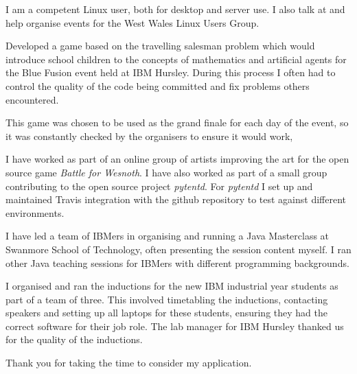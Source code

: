 \documentclass[10pt,stdletter,dateno,sigleft]{newlfm} %
\begin{document}
\begin{newlfm}
I am a competent Linux user, both for desktop and server use. I also talk at 
and help organise events for the West Wales Linux Users Group.

Developed a game based on the travelling salesman problem which would introduce
school children to the concepts of mathematics and artificial agents for the
Blue Fusion event held at IBM Hursley. During this process I often had to 
control the quality of the code being committed and fix problems others 
encountered.

This game was chosen to be used as the grand finale for each day of the event,
so it was constantly checked by the organisers to ensure it would work, 

I have worked as part of an online group of artists improving the art for the
open source game \textit{Battle for Wesnoth}. I have also worked as part of a small 
group contributing to the open source project \textit{pytentd}. For \textit{pytentd} I
set up and maintained Travis integration with the github repository to test against
different environments.

I have led a team of IBMers in organising and running a Java Masterclass
at Swanmore School of Technology, often presenting the session content myself.
I ran other Java teaching sessions for IBMers with different programming
backgrounds.

I organised and ran the inductions for the new IBM industrial year students as
part of a team of three. This involved timetabling the inductions, contacting
speakers and setting up all laptops for these students, ensuring they had the
correct software for their job role. The lab manager for IBM Hursley 
thanked us for the quality of the inductions.



 

Thank you for taking the time to consider my application.


\end{newlfm}
\end{document}
